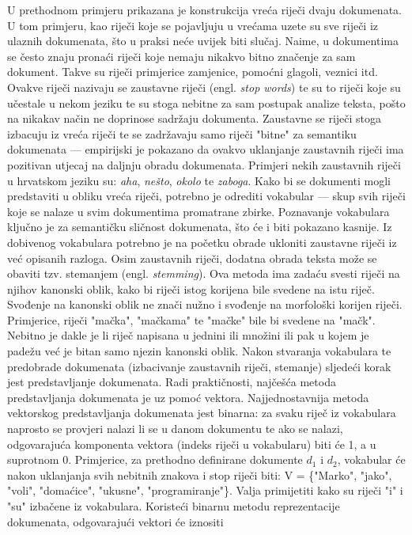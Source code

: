 \documentclass[times, utf8, zavrsni]{fer}
\begin{document}
U prethodnom primjeru prikazana je konstrukcija vreća riječi dvaju dokumenata. U tom primjeru, kao riječi koje se pojavljuju u vrećama uzete su sve riječi iz ulaznih dokumenata, što u praksi neće uvijek biti slučaj. Naime, u dokumentima se često znaju pronaći riječi koje nemaju nikakvo bitno značenje za sam dokument. Takve su riječi primjerice zamjenice, pomoćni glagoli, veznici itd. Ovakve riječi nazivaju se zaustavne riječi (engl. \textit{stop words}) te su to riječi koje su učestale u nekom jeziku te su stoga nebitne za sam postupak analize teksta, pošto na nikakav način ne doprinose sadržaju dokumenta. Zaustavne se riječi stoga izbacuju iz vreća riječi te se zadržavaju samo riječi "bitne" za semantiku dokumenata — empirijski je pokazano da ovakvo uklanjanje zaustavnih riječi ima pozitivan utjecaj na daljnju obradu dokumenata. Primjeri nekih zaustavnih riječi u hrvatskom jeziku su: \textit{aha}, \textit{nešto}, \textit{okolo} te \textit{zaboga}.
Kako bi se dokumenti mogli predstaviti u obliku vreća riječi, potrebno je odrediti vokabular — skup svih riječi koje se nalaze u svim dokumentima promatrane zbirke. Poznavanje vokabulara ključno je za semantičku sličnost dokumenata, što će i biti pokazano kasnije. Iz dobivenog vokabulara potrebno je na početku obrade ukloniti zaustavne riječi iz već opisanih razloga. Osim zaustavnih riječi, dodatna obrada teksta može se obaviti tzv. stemanjem (engl. \textit{stemming}). Ova metoda ima zadaću svesti riječi na njihov kanonski oblik, kako bi riječi istog korijena bile svedene na istu riječ. Svođenje na kanonski oblik ne znači nužno i svođenje na morfološki korijen riječi. Primjerice, riječi "mačka", "mačkama" te "mačke" bile bi svedene na "mačk". Nebitno je dakle je li riječ napisana u jednini ili množini ili pak u kojem je padežu već je bitan samo njezin kanonski oblik.
Nakon stvaranja vokabulara te predobrade dokumenata (izbacivanje zaustavnih riječi, stemanje) sljedeći korak jest predstavljanje dokumenata. Radi praktičnosti, najčešća metoda predstavljanja dokumenata je uz pomoć vektora.
Najjednostavnija metoda vektorskog predstavljanja dokumenata jest binarna: za svaku riječ iz vokabulara naprosto se provjeri nalazi li se u danom dokumentu te ako se nalazi, odgovarajuća komponenta vektora (indeks riječi u vokabularu) biti će 1, a u suprotnom 0. Primjerice, za prethodno definirane dokumente $d_{1}$ i $d_{2}$, vokabular će nakon uklanjanja svih nebitnih znakova i stop riječi biti: V = \{"Marko", "jako", "voli", "domaćice", "ukusne", "programiranje"\}. Valja primijetiti kako su riječi "i" i "su" izbačene iz vokabulara. Koristeći binarnu metodu reprezentacije dokumenata, odgovarajući vektori će iznositi
\end{document}
